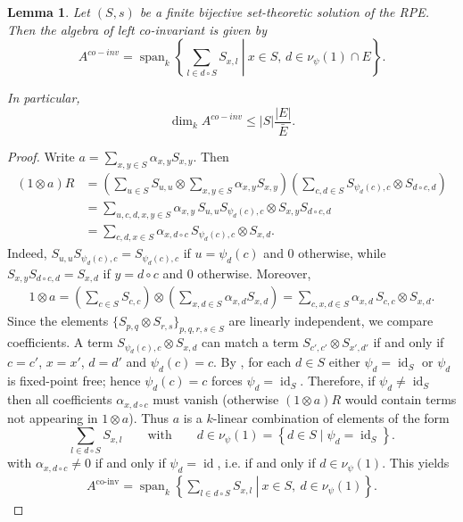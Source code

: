 \documentclass[a4paper,10pt]{amsart}
\newtheorem{lemma}{Lemma}[section]
\theoremstyle{definition}
\theoremstyle{remark}
\DeclareMathOperator{\id}{id}
\begin{document}
\begin{lemma}\label{lemma:co-invariants}
Let $(S,s)$ be a finite bijective set-theoretic solution of the RPE. Then the algebra of left co-invariant is given by 
$$A^{co-inv}=\operatorname{span}_{k}\left\{\left.\sum_{l \in d\circ S}S_{x,l}\ \right|\ x \in S, \, d \in \nu_{\psi}(1)\cap E\right\}.$$

In particular,
$$\dim_k A^{co-inv}\le |S| \frac{|E|}{\bar{E}}.$$
\end{lemma}
\begin{proof}
Write $a=\sum_{x,y\in S}\alpha_{x,y}S_{x,y}$. Then
\begin{align*}
    (1\otimes a)R
    &=\left(\sum_{u\in S}S_{u,u}\otimes \sum_{x,y\in S}\alpha_{x,y}S_{x,y}\right)
    \left(\sum_{c,d\in S}S_{\psi_d(c),c}\otimes S_{d\circ c,d}\right)\\
    &=\sum_{u,c,d,x,y\in S}\alpha_{x,y}\, S_{u,u}S_{\psi_d(c),c}\otimes S_{x,y}S_{d\circ c,d}\\
    &=\sum_{c,d,x\in S}\alpha_{x,d\circ c}\, S_{\psi_d(c),c}\otimes S_{x,d}.
\end{align*}
Indeed, $S_{u,u}S_{\psi_d(c),c}=S_{\psi_d(c),c}$ if $u=\psi_d(c)$ and $0$ otherwise, while
$S_{x,y}S_{d\circ c,d}=S_{x,d}$ if $y=d\circ c$ and $0$ otherwise.
Moreover, 
\begin{align*}
    1\otimes a=\left(\sum_{c\in S}S_{c,c}\right)\otimes \left(\sum_{x,d\in S}\alpha_{x,d}S_{x,d}\right)
    =\sum_{c,x,d\in S}\alpha_{x,d}\, S_{c,c}\otimes S_{x,d}.
\end{align*}
Since the elements $\{S_{p,q}\otimes S_{r,s}\}_{p,q,r,s\in S}$ are linearly independent, we compare coefficients. A term $S_{\psi_d(c),c}\otimes S_{x,d}$ can match a term $S_{c',c'}\otimes S_{x',d'}$ if and only if
$c=c'$, $x=x'$, $d=d'$ and $\psi_d(c)= c$. 
By , for each $d\in S$ either $\psi_d=\id_S$ or $\psi_d$ is fixed-point free; hence
$\psi_d(c)=c$ forces $\psi_d=\id_S$. Therefore, if $\psi_d\neq\id_S$ then all coefficients
$\alpha_{x,d\circ c}$ must vanish (otherwise $(1\otimes a)R$ would contain terms not appearing in $1\otimes a$).
Thus $a$ is a $k$-linear combination of elements of the form
$$\sum_{l\in d\circ S} S_{x,l}
\qquad\text{with}\qquad d\in \nu_{\psi}(1)=\left\{d\in S\mid \psi_d=\id_S\right\}.$$
with $\alpha_{x,d\circ c}\neq 0$ if and only if $\psi_d =\operatorname{id}$, i.e. if and only if $d\in \nu_{\psi}(1)$. 
This yields
\begin{align*}
    A^{\mathrm{co\mbox{-}inv}}
    =\operatorname{span}_{k}\left\{
    \left.\sum_{l \in d\circ S} S_{x,l}\ \right|\ x \in S,\ d \in \nu_{\psi}(1)
    \right\}.
\end{align*}


\end{proof}
\end{document}
